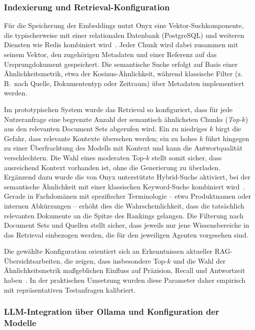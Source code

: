 \subsubsection{Indexierung und Retrieval-Konfiguration}

Für die Speicherung der Embeddings nutzt Onyx eine Vektor-Suchkomponente, die typischerweise mit einer relationalen Datenbank (PostgreSQL) und weiteren Diensten wie Redis kombiniert wird~\cite{onyx_github}.
Jeder Chunk wird dabei zusammen mit seinem Vektor, den zugehörigen Metadaten und einer Referenz auf das Ursprungdokument gespeichert.
Die semantische Suche erfolgt auf Basis einer Ähnlichkeitsmetrik, etwa der Kosinus-Ähnlichkeit, während klassische Filter (z.\,B.\ nach Quelle, Dokumententyp oder Zeitraum) über Metadaten implementiert werden.

Im prototypischen System wurde das Retrieval so konfiguriert, dass für jede Nutzeranfrage eine begrenzte Anzahl der semantisch ähnlichsten Chunks (\textit{Top-$k$}) aus den relevanten Document Sets abgerufen wird.
Ein zu niedriges $k$ birgt die Gefahr, dass relevante Kontexte übersehen werden; ein zu hohes $k$ führt hingegen zu einer Überfrachtung des Modells mit Kontext und kann die Antwortqualität verschlechtern.
Die Wahl eines moderaten Top-$k$ stellt somit sicher, dass ausreichend Kontext vorhanden ist, ohne die Generierung zu überladen.
Ergänzend dazu wurde die von Onyx unterstützte Hybrid-Suche aktiviert, bei der semantische Ähnlichkeit mit einer klassischen Keyword-Suche kombiniert wird~\cite{onyx_docs}.
Gerade in Fachdomänen mit spezifischer Terminologie – etwa Produktnamen oder internen Abkürzungen – erhöht dies die Wahrscheinlichkeit, dass die tatsächlich relevanten Dokumente an die Spitze des Rankings gelangen.
Die Filterung nach Document Sets und Quellen stellt sicher, dass jeweils nur jene Wissensbereiche in das Retrieval einbezogen werden, die für den jeweiligen Agenten vorgesehen sind.

Die gewählte Konfiguration orientiert sich an Erkenntnissen aktueller RAG-Übersichtsarbeiten, die zeigen, dass insbesondere Top-$k$ und die Wahl der Ähnlichkeitsmetrik maßgeblichen Einfluss auf Präzision, Recall und Antwortzeit haben~\cite{gao2023retrieval}.
In der praktischen Umsetzung wurden diese Parameter daher empirisch mit repräsentativen Testanfragen kalibriert.

\subsubsection{LLM-Integration über Ollama und Konfiguration der Modelle}

